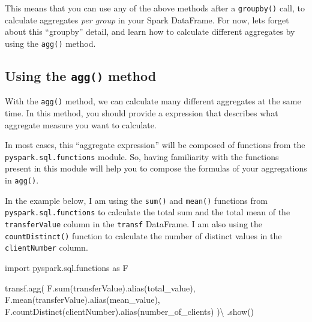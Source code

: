 \documentclass[
  11pt,
  letterpaper,
  DIV=11,
  numbers=noendperiod]{scrreprt}
\newenvironment{Shaded}{\begin{snugshade}}{\end{snugshade}}
\newcommand{\BuiltInTok}[1]{\textcolor[rgb]{0.00,0.23,0.31}{#1}}
\newcommand{\ImportTok}[1]{\textcolor[rgb]{0.00,0.46,0.62}{#1}}
\newcommand{\NormalTok}[1]{\textcolor[rgb]{0.00,0.23,0.31}{#1}}
\newcommand{\OperatorTok}[1]{\textcolor[rgb]{0.37,0.37,0.37}{#1}}
\newcommand{\StringTok}[1]{\textcolor[rgb]{0.13,0.47,0.30}{#1}}
\begin{document}
This means that you can use any of the above methods after a
\texttt{groupby()} call, to calculate aggregates \emph{per group} in
your Spark DataFrame. For now, lets forget about this ``groupby''
detail, and learn how to calculate different aggregates by using the
\texttt{agg()} method.

\subsection{\texorpdfstring{Using the \texttt{agg()}
method}{Using the agg() method}}\label{sec-agg-method}

With the \texttt{agg()} method, we can calculate many different
aggregates at the same time. In this method, you should provide a
expression that describes what aggregate measure you want to calculate.

In most cases, this ``aggregate expression'' will be composed of
functions from the \texttt{pyspark.sql.functions} module. So, having
familiarity with the functions present in this module will help you to
compose the formulas of your aggregations in \texttt{agg()}.

In the example below, I am using the \texttt{sum()} and \texttt{mean()}
functions from \texttt{pyspark.sql.functions} to calculate the total sum
and the total mean of the \texttt{transferValue} column in the
\texttt{transf} DataFrame. I am also using the \texttt{countDistinct()}
function to calculate the number of distinct values in the
\texttt{clientNumber} column.

\begin{Shaded}
\begin{Highlighting}[]
\ImportTok{import}\NormalTok{ pyspark.sql.functions }\ImportTok{as}\NormalTok{ F}

\NormalTok{transf.agg(}
\NormalTok{    F.}\BuiltInTok{sum}\NormalTok{(}\StringTok{\textquotesingle{}transferValue\textquotesingle{}}\NormalTok{).alias(}\StringTok{\textquotesingle{}total\_value\textquotesingle{}}\NormalTok{),}
\NormalTok{    F.mean(}\StringTok{\textquotesingle{}transferValue\textquotesingle{}}\NormalTok{).alias(}\StringTok{\textquotesingle{}mean\_value\textquotesingle{}}\NormalTok{),}
\NormalTok{    F.countDistinct(}\StringTok{\textquotesingle{}clientNumber\textquotesingle{}}\NormalTok{).alias(}\StringTok{\textquotesingle{}number\_of\_clients\textquotesingle{}}\NormalTok{)}
\NormalTok{  )}\OperatorTok{\textbackslash{}}
\NormalTok{  .show()}
\end{Highlighting}
\end{Shaded}
\end{document}
